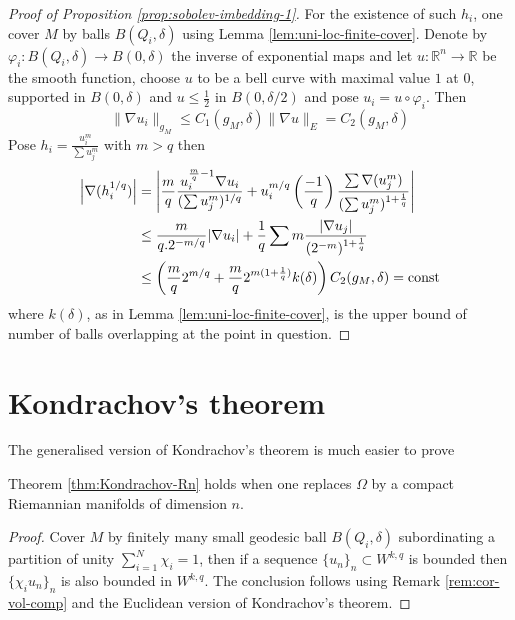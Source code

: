 \begin{proof}[Proof of Proposition \ref{prop:sobolev-imbedding-1}]
For the existence of such \(h_i\), one cover \(M\) by balls \(B(Q_i,\delta)\) using
Lemma \ref{lem:uni-loc-finite-cover}. Denote by \(\varphi_i:B(Q_i,\delta) \longrightarrow
B(0,\delta)\) the inverse of exponential maps and let \(u:  \mathbb{R}^n \longrightarrow
\mathbb{R}\) be the smooth function, choose \(u\) to be a bell curve with maximal value
\(1\) at \(0\), supported in \(B(0,\delta)\) and \(u\leq \frac{1}{2}\) in \(B(0,\delta/2)\) and pose \(u_i = u\circ \varphi_i\). Then 
\[
 \|\nabla u_i\|_{g_M} \leq C_1(g_M,\delta) \|\nabla u\|_E = C_2(g_M,\delta)
\]
Pose \(h_i = \frac{u_i^m}{\sum u_j^m}\) with \(m>q\) then
\begin{equation*}
\begin{split}
\left|\nabla(h_i^{1/q})\right| &= \left|\frac{m}{q}\frac{u_i^{\frac{m}{q} - 1}\nabla u_i}{(\sum u_j^m)^{1/q}} + u_i^{m/q}\left(\frac{-1}{q}\right)\frac{\sum\nabla (u_j^m)}{(\sum u_j^m)^{1+ \frac{1}{q}}}\right|\\
		  &\leq \frac{m}{q.2^{-m/q}}|\nabla u_i| + \frac{1}{q}\sum m \frac{|\nabla u_j|}{(2^{-m})^{1+\frac{1}{q}}}\\
		  &\leq \left( \frac{m}{q}2^{m/q} + \frac{m}{q}2^{m(1+\frac{1}{q})}k(\delta)\right)C_2(g_M,\delta)=\mathop{\rm const }\nolimits
\end{split}   
\end{equation*}
where \(k(\delta)\), as in Lemma \ref{lem:uni-loc-finite-cover}, is the upper bound of
number of balls overlapping at the point in question.
\end{proof}






\section{Kondrachov's theorem}
\label{sec:org74edf88}
The generalised version of Kondrachov's theorem is much easier to prove
\begin{theorem}[Kondrachov]
\label{thm:kondrachov}
Theorem \ref{thm:Kondrachov-Rn} holds when one replaces \(\Omega\) by a compact Riemannian
manifolds of dimension \(n\).
\end{theorem}
\begin{proof}
Cover \(M\) by finitely many small geodesic ball \(B(Q_i,\delta)\) subordinating a partition of unity \(\sum_{i=1}^N \chi_i = 1\), then if a sequence \(\{u_n\}_n \subset W^{k,q}\) is bounded then \(\{\chi_i u_n\}_n\) is also bounded in \(W^{k,q}\). The conclusion follows using Remark \ref{rem:cor-vol-comp} and the
Euclidean version of Kondrachov's theorem.
\end{proof}



